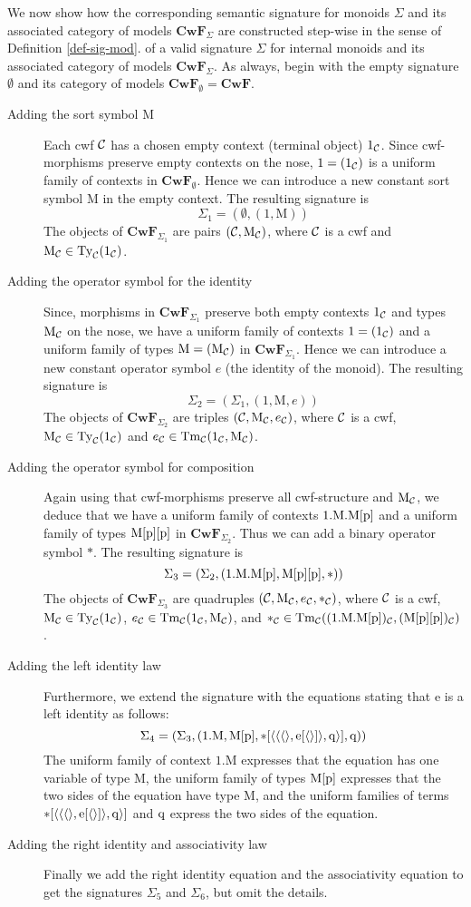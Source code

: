 \documentclass{lmcs}
\def\Cwf{\mathbf{CwF}}
\def\Mon{\mathrm{M}}
\def\idmon{\mathrm{e}}
\def\comp{\mathrm{*}}
\begin{document}
We now show how the corresponding semantic signature for monoids $\Sigma$ and its associated category of models $\Cwf_\Sigma$ are constructed step-wise in the sense of Definition \ref{def-sig-mod}. of a valid signature $\Sigma$ for internal monoids and its associated category of models $\Cwf_\Sigma$. As always, begin with the empty signature $\emptyset$ and its category of models $\Cwf_\emptyset = \Cwf$.
\begin{description}
\item[Adding the sort symbol $\Mon$] Each cwf ${\mathcal C}$ has a chosen empty context (terminal object) $1_{\mathcal C}$. Since cwf-morphisms preserve empty contexts on the nose, $1 = (1_{\mathcal C})$ is a uniform family of contexts in $\Cwf_\emptyset$. Hence we can introduce a new constant sort symbol $\Mon$ in the empty context. The resulting signature  is
$$
\Sigma_1 = (\emptyset, (1,\Mon))
$$
The objects of $\Cwf_{\Sigma_1}$  are pairs $(\C,\Mon_\C)$, where ${\mathcal C}$ is a cwf and $\Mon_\C \in \Ty_\C(1_\C)$.
\item[Adding the operator symbol for the identity]
Since, morphisms in $\Cwf_{\Sigma_1}$ preserve both empty contexts $1_{\mathcal C}$ and types $\Mon_\C$ on the nose, we have a uniform family of contexts $1 = (1_{\mathcal C})$ and a uniform family of types $\Mon = (\Mon_\C)$ in $\Cwf_{\Sigma_1}$. Hence we can introduce a new constant operator symbol $e$ (the identity of the monoid).  The resulting signature  is
$$
\Sigma_2 = (\Sigma_1, (1,\Mon,e))
$$
The objects of $\Cwf_{\Sigma_2}$  are triples $(\C,\Mon_\C,e_\C)$, where ${\mathcal C}$ is a cwf, $\Mon_\C \in \Ty_\C(1_\C)$ and $e_\C \in \Tm_\C(1_\C,\Mon_\C)$.
\item[Adding the operator symbol for composition]
Again using that cwf-morphisms preserve all cwf-structure and $\Mon_\C$, we deduce that we have a uniform family of contexts $1.\Mon.\Mon[\p]$ and a uniform family of types $\Mon[\p][\p]$ in $\Cwf_{\Sigma_2}$. Thus we can add a binary operator symbol $\comp$. The resulting signature is
$$
\Sigma_3 = (\Sigma_2, (1.\Mon.\Mon[\p],\Mon[\p][\p],\comp))
$$
The objects of $\Cwf_{\Sigma_3}$  are quadruples $(\C,\Mon_\C,e_\C,*_\C)$, where ${\mathcal C}$ is a cwf, $\Mon_\C \in \Ty_\C(1_\C)$, $e_\C \in \Tm_\C(1_\C,\Mon_\C)$, and $*_\C \in \Tm_\C((1.\Mon.\Mon[\p])_\C,(\Mon[\p][\p])_\C)$.
\item[Adding the left identity law]
Furthermore, we extend the signature with the equations stating that $\idmon$ is a left identity as follows:
$$
\Sigma_4 = (\Sigma_3, (1.\Mon, \Mon[\p], \comp[\tuple{\tuple{\tuple{},\idmon[\tuple{}]},\q}], \q))
$$
The uniform family of context $1.\Mon$ expresses that the equation has one variable of type $\Mon$, the uniform family of types $\Mon[\p]$ expresses that the two sides of the equation have type $\Mon$, and the uniform families of terms $\comp[\tuple{\tuple{\tuple{},\idmon[\tuple{}]},\q}]$ and $\mathrm{q}$ express the two sides of the equation.
\item[Adding the right identity and associativity law]
Finally we add the right identity equation and the associativity equation to get the signatures $\Sigma_5$ and $\Sigma_6$, but omit the details. 
\end{description}
\end{document}
